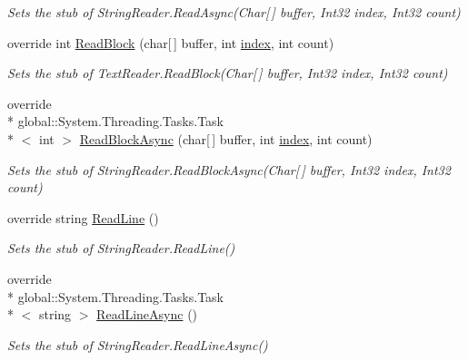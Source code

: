 \begin{DoxyCompactItemize}
\begin{DoxyCompactList}\small\item\em Sets the stub of String\-Reader.\-Read\-Async(\-Char\mbox{[}$\,$\mbox{]} buffer, Int32 index, Int32 count)\end{DoxyCompactList}\item 
override int \hyperlink{class_system_1_1_i_o_1_1_fakes_1_1_stub_string_reader_a047cb880f09e337b5b75bb40360ded5f}{Read\-Block} (char\mbox{[}$\,$\mbox{]} buffer, int \hyperlink{jquery-1_810_82-vsdoc_8js_a75bb12d1f23302a9eea93a6d89d0193e}{index}, int count)
\begin{DoxyCompactList}\small\item\em Sets the stub of Text\-Reader.\-Read\-Block(\-Char\mbox{[}$\,$\mbox{]} buffer, Int32 index, Int32 count)\end{DoxyCompactList}\item 
override \\*
global\-::\-System.\-Threading.\-Tasks.\-Task\\*
$<$ int $>$ \hyperlink{class_system_1_1_i_o_1_1_fakes_1_1_stub_string_reader_ac98e4c7418962b6cf1fe40e14a3cc334}{Read\-Block\-Async} (char\mbox{[}$\,$\mbox{]} buffer, int \hyperlink{jquery-1_810_82-vsdoc_8js_a75bb12d1f23302a9eea93a6d89d0193e}{index}, int count)
\begin{DoxyCompactList}\small\item\em Sets the stub of String\-Reader.\-Read\-Block\-Async(\-Char\mbox{[}$\,$\mbox{]} buffer, Int32 index, Int32 count)\end{DoxyCompactList}\item 
override string \hyperlink{class_system_1_1_i_o_1_1_fakes_1_1_stub_string_reader_ab3e0bf26b6e7c4e2e83a87626c54f0de}{Read\-Line} ()
\begin{DoxyCompactList}\small\item\em Sets the stub of String\-Reader.\-Read\-Line()\end{DoxyCompactList}\item 
override \\*
global\-::\-System.\-Threading.\-Tasks.\-Task\\*
$<$ string $>$ \hyperlink{class_system_1_1_i_o_1_1_fakes_1_1_stub_string_reader_ae223b6039dbda09b87fef576a3d3cc26}{Read\-Line\-Async} ()
\begin{DoxyCompactList}\small\item\em Sets the stub of String\-Reader.\-Read\-Line\-Async()\end{DoxyCompactList}\item 

\end{DoxyCompactItemize}
